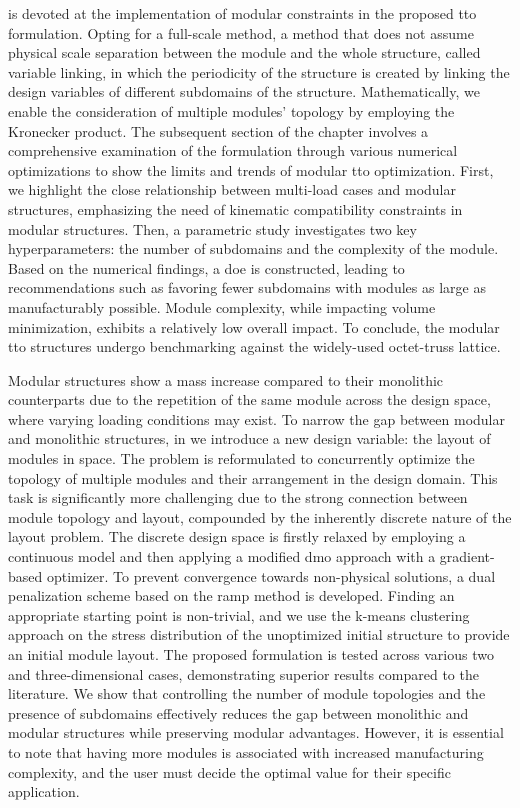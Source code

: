  is devoted at the implementation of modular constraints in the proposed \gls{tto} formulation. Opting for a full-scale method, a method that does not assume physical scale separation between the module and the whole structure, called variable linking, in which the periodicity of the structure is created by linking the design variables of different subdomains of the structure. Mathematically, we enable the consideration of multiple modules' topology by employing the Kronecker product. The subsequent section of the chapter involves a comprehensive examination of the formulation through various numerical optimizations to show the limits and trends of modular \gls{tto} optimization. First, we highlight the close relationship between multi-load cases and modular structures, emphasizing the need of kinematic compatibility constraints in modular structures. Then, a parametric study investigates two key hyperparameters: the number of subdomains and the complexity of the module. Based on the numerical findings, a \gls{doe} is constructed, leading to recommendations such as favoring fewer subdomains with modules as large as manufacturably possible. Module complexity, while impacting volume minimization, exhibits a relatively low overall impact. To conclude, the modular \gls{tto} structures undergo benchmarking against the widely-used octet-truss lattice.

Modular structures show a mass increase compared to their monolithic counterparts due to the repetition of the same module across the design space, where varying loading conditions may exist. To narrow the gap between modular and monolithic structures, in  we introduce a new design variable: the layout of modules in space. The problem is reformulated to concurrently optimize the topology of multiple modules and their arrangement in the design domain. This task is significantly more challenging due to the strong connection between module topology and layout, compounded by the inherently discrete nature of the layout problem. The discrete design space is firstly relaxed by employing a continuous model and then applying a modified \gls{dmo} approach with a gradient-based optimizer. To prevent convergence towards non-physical solutions, a dual penalization scheme based on the \gls{ramp} method is developed. Finding an appropriate starting point is non-trivial, and we use the k-means clustering approach on the stress distribution of the unoptimized initial structure to provide an initial module layout. The proposed formulation is tested across various two and three-dimensional cases, demonstrating superior results compared to the literature. We show that controlling the number of module topologies and the presence of subdomains effectively reduces the gap between monolithic and modular structures while preserving modular advantages. However, it is essential to note that having more modules is associated with increased manufacturing complexity, and the user must decide the optimal value for their specific application.

